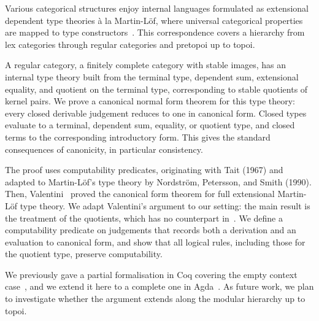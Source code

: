 \documentclass{sstt-2026-abstract}
\begin{document}
Various categorical structures enjoy internal languages formulated as extensional dependent type theories à la Martin-L\"of, where universal categorical properties are mapped to type constructors~\cite{maietti2005}. This correspondence covers a hierarchy from lex categories through regular categories and pretopoi up to topoi.

A regular category, a finitely complete category with stable images, has an internal type theory built from the terminal type, dependent sum, extensional equality, and quotient on the terminal type, corresponding to stable quotients of kernel pairs. We prove a canonical normal form theorem for this type theory: every closed derivable judgement reduces to one in canonical form. Closed types evaluate to a terminal, dependent sum, equality, or quotient type, and closed terms to the corresponding introductory form. This gives the standard consequences of canonicity, in particular consistency.

The proof uses computability predicates, originating with Tait (1967) and adapted to Martin-L\"of's type theory by Nordstr\"om, Petersson, and Smith (1990). Then, Valentini~\cite{valentini2000} proved the canonical form theorem for full extensional Martin-L\"of type theory. We adapt Valentini's argument to our setting: the main result is the treatment of the quotients, which has no counterpart in~\cite{valentini2000}. We define a computability predicate on judgements that records both a derivation and an evaluation to canonical form, and show that all logical rules, including those for the quotient type, preserve computability.

We previously gave a partial formalisation in Coq covering the empty context case~\cite{borsetto2023}, and we extend it here to a complete one in Agda~\cite{regcat2026}. As future work, we plan to investigate whether the argument extends along the modular hierarchy up to topoi.

\printbibliography{}
\end{document}
